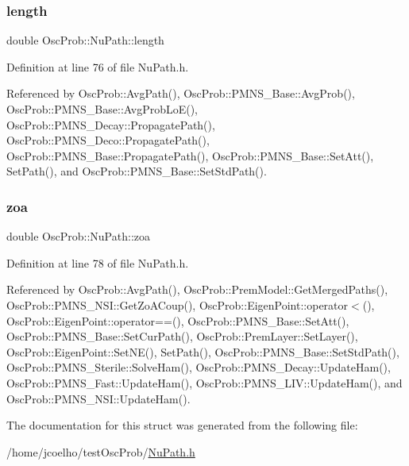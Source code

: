 \mbox{\label{structOscProb_1_1NuPath_af22660894b6e25cf835500381b155557}} 
\subsubsection{\texorpdfstring{length}{length}}
{\footnotesize\ttfamily double Osc\+Prob\+::\+Nu\+Path\+::length}



Definition at line 76 of file Nu\+Path.\+h.



Referenced by Osc\+Prob\+::\+Avg\+Path(), Osc\+Prob\+::\+P\+M\+N\+S\+\_\+\+Base\+::\+Avg\+Prob(), Osc\+Prob\+::\+P\+M\+N\+S\+\_\+\+Base\+::\+Avg\+Prob\+Lo\+E(), Osc\+Prob\+::\+P\+M\+N\+S\+\_\+\+Decay\+::\+Propagate\+Path(), Osc\+Prob\+::\+P\+M\+N\+S\+\_\+\+Deco\+::\+Propagate\+Path(), Osc\+Prob\+::\+P\+M\+N\+S\+\_\+\+Base\+::\+Propagate\+Path(), Osc\+Prob\+::\+P\+M\+N\+S\+\_\+\+Base\+::\+Set\+Att(), Set\+Path(), and Osc\+Prob\+::\+P\+M\+N\+S\+\_\+\+Base\+::\+Set\+Std\+Path().

\mbox{\label{structOscProb_1_1NuPath_af3213f3691ba83c6bc05f4a3490f6b31}} 
\subsubsection{\texorpdfstring{zoa}{zoa}}
{\footnotesize\ttfamily double Osc\+Prob\+::\+Nu\+Path\+::zoa}



Definition at line 78 of file Nu\+Path.\+h.



Referenced by Osc\+Prob\+::\+Avg\+Path(), Osc\+Prob\+::\+Prem\+Model\+::\+Get\+Merged\+Paths(), Osc\+Prob\+::\+P\+M\+N\+S\+\_\+\+N\+S\+I\+::\+Get\+Zo\+A\+Coup(), Osc\+Prob\+::\+Eigen\+Point\+::operator$<$(), Osc\+Prob\+::\+Eigen\+Point\+::operator==(), Osc\+Prob\+::\+P\+M\+N\+S\+\_\+\+Base\+::\+Set\+Att(), Osc\+Prob\+::\+P\+M\+N\+S\+\_\+\+Base\+::\+Set\+Cur\+Path(), Osc\+Prob\+::\+Prem\+Layer\+::\+Set\+Layer(), Osc\+Prob\+::\+Eigen\+Point\+::\+Set\+N\+E(), Set\+Path(), Osc\+Prob\+::\+P\+M\+N\+S\+\_\+\+Base\+::\+Set\+Std\+Path(), Osc\+Prob\+::\+P\+M\+N\+S\+\_\+\+Sterile\+::\+Solve\+Ham(), Osc\+Prob\+::\+P\+M\+N\+S\+\_\+\+Decay\+::\+Update\+Ham(), Osc\+Prob\+::\+P\+M\+N\+S\+\_\+\+Fast\+::\+Update\+Ham(), Osc\+Prob\+::\+P\+M\+N\+S\+\_\+\+L\+I\+V\+::\+Update\+Ham(), and Osc\+Prob\+::\+P\+M\+N\+S\+\_\+\+N\+S\+I\+::\+Update\+Ham().



The documentation for this struct was generated from the following file\+:\begin{DoxyCompactItemize}
\item 
/home/jcoelho/test\+Osc\+Prob/\hyperlink{NuPath_8h}{Nu\+Path.\+h}\end{DoxyCompactItemize}
